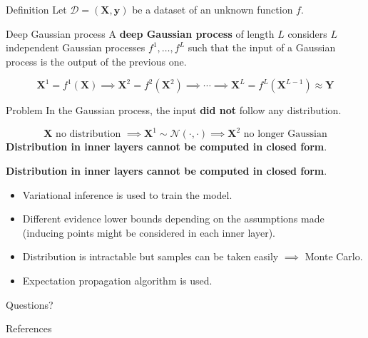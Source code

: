 \documentclass[10pt]{beamer}
\begin{document}
\begin{frame}{Definition}
    Let \( \mathcal{D} = (\bm X, \bm y) \) be a dataset of an unknown function \( f \).
    \begin{alertblock}{Deep Gaussian process}
        A \textbf{deep Gaussian process} of length \( L \) considers \( L \) independent Gaussian processes \( f^1, \dots, f^L \) such that the input of a Gaussian process is the output of the previous one.
    \end{alertblock}
    \[
         \bm{X}^1 = f^1(\bm{X}) \implies  \bm{X}^2 = f^2(\bm{X}^2) \implies \cdots \implies \bm{X}^{L} = f^L(\bm{X}^{L-1}) \approx \bm{Y}
    \]
    \begin{alertblock}{Problem}
        In the Gaussian process, the input \textbf{did not} follow any distribution.
    \end{alertblock}
    \[
         \bm{X} \text{ no distribution } \implies \bm{X}^1 \sim \mathcal{N}(\cdot, \cdot) \implies \bm{X}^2 \text{ no longer Gaussian}
    \]
    \textbf{Distribution in inner layers cannot be computed in closed form}.
\end{frame}

\begin{frame}
    \textbf{Distribution in inner layers cannot be computed in closed form}.

    \begin{itemize}
        \item Variational inference is used to train the model.
        \item Different evidence lower bounds depending on the assumptions made (inducing points might be considered in each inner layer).
        \item Distribution is intractable but samples can be taken easily \( \implies \) Monte Carlo.
        \item Expectation propagation algorithm is used.
    \end{itemize}
\end{frame}

\begin{frame}[standout]
    Questions?
  \end{frame}

\appendix
\nocite{*}
\begin{frame}[allowframebreaks]{References}

  
  
  
\end{frame}
  
\end{document}
